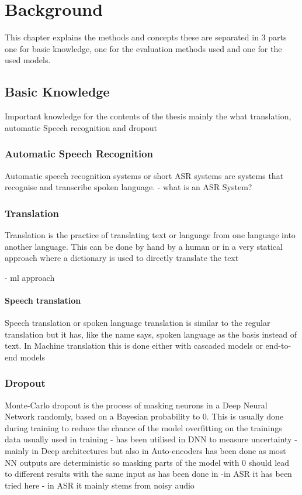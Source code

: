 \chapter{Background}
This chapter explains the methods and concepts these are separated in 3 parts one for basic knowledge, one for the evaluation methods used and one for the used models. 

\section{Basic Knowledge}
Important knowledge for the contents of the thesis mainly the what translation, automatic Speech recognition and dropout


\subsection{Automatic Speech Recognition}
Automatic speech recognition systems or short ASR systems are systems that recognise and transcribe spoken language. 
- what is an ASR System? 


\subsection{Translation}
Translation is the practice of translating text or language from one language into another language. This can be done by hand by a human or in a very statical approach where a dictionary is used to directly translate the text 

- ml approach

\subsubsection{Speech translation}
Speech translation or spoken language translation is similar to the regular translation but it has, like the name says, spoken language as the basis instead of text. 
In Machine translation this is done either with cascaded models or end-to-end models 



\subsection{Dropout}
Monte-Carlo dropout is the process of masking neurons in a Deep Neural Network randomly, based on a Bayesian probability to 0. This is usually done during training to reduce the chance of the model overfitting on the trainings data 
usually used in training 
- has been utilised in DNN to measure uncertainty
- mainly in Deep architectures but also in Auto-encoders
has been done as most NN outputs are deterministic so masking parts of the model with 0 should lead to different results with the same input as has been done in \cite{gal2016dropoutbayesianapproximationrepresenting}
-in ASR it has been tried here  \cite{8683086}
- in ASR it mainly stems from noisy audio 


